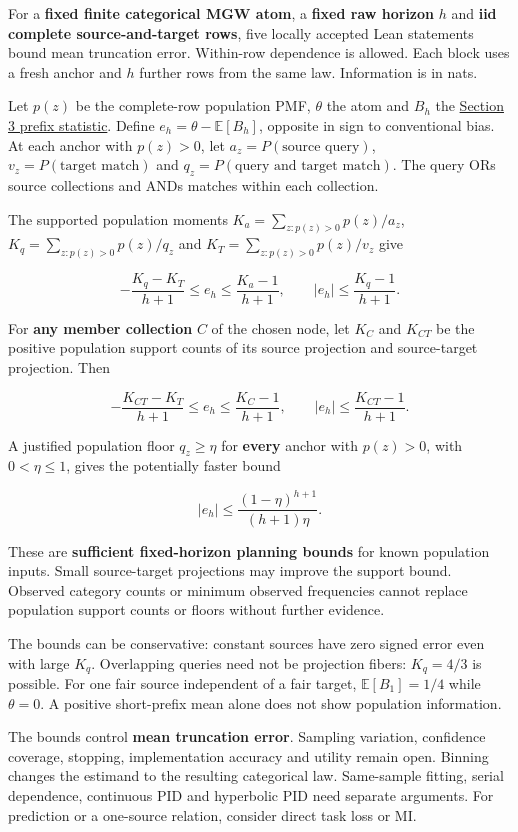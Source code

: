 \documentclass[11pt,a4paper]{article}
\title{\PidReportTitle{What the finite-horizon bias bounds tell you}{Categorical MGW shared exclusions · five exact formal families}}
\author{Sepehr Mahmoudian}
\date{8 September 2026}
\begin{document}
\PidMakeTitle
For a \textbf{fixed finite categorical MGW atom}, a \textbf{fixed raw horizon} \(h\) and \textbf{iid complete source-and-target rows}, five locally accepted Lean statements bound mean truncation error. Within-row dependence is allowed. Each block uses a fresh anchor and \(h\) further rows from the same law. Information is in nats.

Let \(p(z)\) be the complete-row population PMF, \(\theta\) the atom and \(B_h\) the \href{https://github.com/sepahead/pid-rs/blob/main/audit/formal/lean-prefix-mgw-bias/EXPOSITION.md}{Section 3 prefix statistic}. Define \(e_h=\theta-\mathbb E[B_h]\), opposite in sign to conventional bias. At each anchor with \(p(z)>0\), let \(a_z=P(\text{source query})\), \(v_z=P(\text{target match})\) and \(q_z=P(\text{query and target match})\). The query ORs source collections and ANDs matches within each collection.

The supported population moments \(K_a=\sum_{z:p(z)>0}p(z)/a_z\), \(K_q=\sum_{z:p(z)>0}p(z)/q_z\) and \(K_T=\sum_{z:p(z)>0}p(z)/v_z\) give

\[
-\frac{K_q-K_T}{h+1}\le e_h\le\frac{K_a-1}{h+1},
\qquad
|e_h|\le\frac{K_q-1}{h+1}.
\]

For \textbf{any member collection} \(C\) of the chosen node, let \(K_C\) and \(K_{CT}\) be the positive population support counts of its source projection and source-target projection. Then

\[
-\frac{K_{CT}-K_T}{h+1}\le e_h\le\frac{K_C-1}{h+1},
\qquad
|e_h|\le\frac{K_{CT}-1}{h+1}.
\]

A justified population floor \(q_z\ge\eta\) for \textbf{every} anchor with \(p(z)>0\), with \(0<\eta\le1\), gives the potentially faster bound

\[
|e_h|\le\frac{(1-\eta)^{h+1}}{(h+1)\eta}.
\]

These are \textbf{sufficient fixed-horizon planning bounds} for known population inputs. Small source-target projections may improve the support bound. Observed category counts or minimum observed frequencies cannot replace population support counts or floors without further evidence.

The bounds can be conservative: constant sources have zero signed error even with large \(K_q\). Overlapping queries need not be projection fibers: \(K_q=4/3\) is possible. For one fair source independent of a fair target, \(\mathbb E[B_1]=1/4\) while \(\theta=0\). A positive short-prefix mean alone does not show population information.

The bounds control \textbf{mean truncation error}. Sampling variation, confidence coverage, stopping, implementation accuracy and utility remain open. Binning changes the estimand to the resulting categorical law. Same-sample fitting, serial dependence, continuous PID and hyperbolic PID need separate arguments. For prediction or a one-source relation, consider direct task loss or MI.
\end{document}

